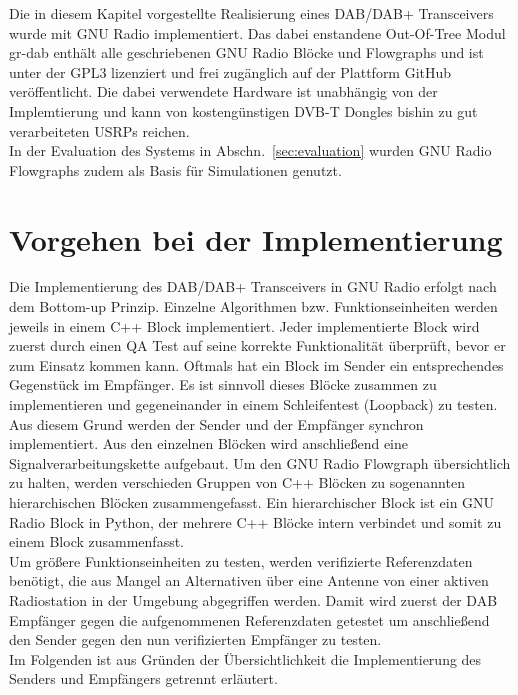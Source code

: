 Die in diesem Kapitel vorgestellte Realisierung eines DAB/DAB+ Transceivers wurde mit GNU Radio implementiert. Das dabei enstandene Out-Of-Tree Modul gr-dab enthält alle geschriebenen GNU Radio Blöcke und Flowgraphs und ist unter der \ac{GPL3} lizenziert und frei zugänglich auf der Plattform GitHub~\cite{repo:gr-dab} veröffentlicht. Die dabei verwendete Hardware ist unabhängig von der Implemtierung und kann von kostengünstigen DVB-T Dongles bishin zu gut verarbeiteten \acp{USRP} reichen.\\
In der Evaluation des Systems in Abschn.~\ref{sec:evaluation} wurden GNU Radio Flowgraphs zudem als Basis für Simulationen genutzt.

\section{Vorgehen bei der Implementierung}
Die Implementierung des DAB/DAB+ Transceivers in GNU Radio erfolgt nach dem Bottom-up Prinzip. Einzelne Algorithmen bzw. Funktionseinheiten werden jeweils in einem C++ Block implementiert. Jeder implementierte Block wird zuerst durch einen \ac{QA} Test auf seine korrekte Funktionalität überprüft, bevor er zum Einsatz kommen kann. Oftmals hat ein Block im Sender ein entsprechendes Gegenstück im Empfänger. Es ist sinnvoll dieses Blöcke zusammen zu implementieren und gegeneinander in einem Schleifentest (Loopback) zu testen. Aus diesem Grund werden der Sender und der Empfänger synchron implementiert. Aus den einzelnen Blöcken wird anschließend eine Signalverarbeitungskette aufgebaut. Um den GNU Radio Flowgraph übersichtlich zu halten, werden verschieden Gruppen von C++ Blöcken zu sogenannten hierarchischen Blöcken zusammengefasst. Ein hierarchischer Block ist ein GNU Radio Block in Python, der mehrere C++ Blöcke intern verbindet und somit zu einem Block zusammenfasst.\\
Um größere Funktionseinheiten zu testen, werden verifizierte Referenzdaten benötigt, die aus Mangel an Alternativen über eine Antenne von einer aktiven Radiostation in der Umgebung abgegriffen werden. Damit wird zuerst der DAB Empfänger gegen die aufgenommenen Referenzdaten getestet um anschließend den Sender gegen den nun verifizierten Empfänger zu testen.\\
Im Folgenden ist aus Gründen der Übersichtlichkeit die Implementierung des Senders und Empfängers getrennt erläutert.